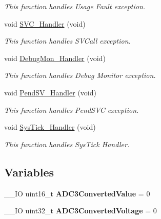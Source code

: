 \begin{DoxyCompactItemize}
\begin{DoxyCompactList}\small\item\em This function handles Usage Fault exception. \end{DoxyCompactList}\item 
void \hyperlink{group___a_d_c___a_d_c3___d_m_a_ga3e5ddb3df0d62f2dc357e64a3f04a6ce}{S\-V\-C\-\_\-\-Handler} (void)
\begin{DoxyCompactList}\small\item\em This function handles S\-V\-Call exception. \end{DoxyCompactList}\item 
void \hyperlink{group___a_d_c___a_d_c3___d_m_a_gadbdfb05858cc36fc520974df37ec3cb0}{Debug\-Mon\-\_\-\-Handler} (void)
\begin{DoxyCompactList}\small\item\em This function handles Debug Monitor exception. \end{DoxyCompactList}\item 
void \hyperlink{group___a_d_c___a_d_c3___d_m_a_ga6303e1f258cbdc1f970ce579cc015623}{Pend\-S\-V\-\_\-\-Handler} (void)
\begin{DoxyCompactList}\small\item\em This function handles Pend\-S\-V\-C exception. \end{DoxyCompactList}\item 
void \hyperlink{group___a_d_c___a_d_c3___d_m_a_gab5e09814056d617c521549e542639b7e}{Sys\-Tick\-\_\-\-Handler} (void)
\begin{DoxyCompactList}\small\item\em This function handles Sys\-Tick Handler. \end{DoxyCompactList}\end{DoxyCompactItemize}
\subsection*{Variables}
\begin{DoxyCompactItemize}
\item 
\hypertarget{group___a_d_c___a_d_c3___d_m_a_ga72b97362ee8b9db3f8b6fa6b0151b4d0}{\-\_\-\-\_\-\-I\-O uint16\-\_\-t {\bfseries A\-D\-C3\-Converted\-Value} = 0}\label{group___a_d_c___a_d_c3___d_m_a_ga72b97362ee8b9db3f8b6fa6b0151b4d0}

\item 
\hypertarget{group___a_d_c___a_d_c3___d_m_a_gabcf4dc4f7993910e7d23b207ae82c9fe}{\-\_\-\-\_\-\-I\-O uint32\-\_\-t {\bfseries A\-D\-C3\-Converted\-Voltage} = 0}\label{group___a_d_c___a_d_c3___d_m_a_gabcf4dc4f7993910e7d23b207ae82c9fe}

\end{DoxyCompactItemize}


